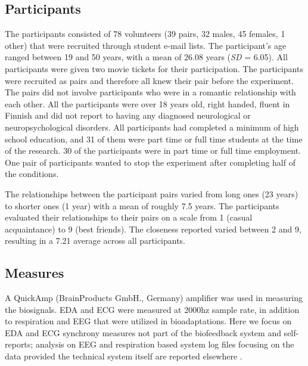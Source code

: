\documentclass[manuscript, review = false, screen]{acmart}
\begin{document}
\subsection{Participants}
The participants consisted of 78 volunteers (39 pairs,  32 males, 45 females, 1 other) that were recruited through student e-mail lists. The participant's age ranged between 19 and 50 years, with a mean of 26.08 years (\textit{SD} = 6.05). All participants were given two movie tickets for their participation. The participants were recruited as pairs and therefore all knew their pair before the experiment. The pairs did not involve participants who were in a romantic relationship with each other. All the participants were over 18 years old, right handed, fluent in Finnish and did not report to having any diagnosed neurological or neuropsychological disorders. All participants had completed a minimum of high school education, and 31 of them were part time or full time students at the time of the research. 30 of the participants were in part time or full time employment. One pair of participants wanted to stop the experiment after completing half of the conditions.

The relationships between the participant pairs varied from long ones (23 years) to shorter ones (1 year) with a mean of roughly 7.5 years. The participants evaluated their relationships to their pairs on a scale from 1 (casual acquaintance) to 9 (best friends). The closeness reported varied between 2 and 9, resulting in a 7.21 average across all participants. 

\subsection{Measures}
A QuickAmp (BrainProducts GmbH., Germany) amplifier was used in measuring the biosignals. EDA and ECG were measured at 2000hz sample rate, in addition to respiration and EEG that were utilized in bioadaptations. Here we focus on EDA and ECG synchrony measures not part of the biofeedback system and self-reports; analysis on EEG and respiration based system log files focusing on the data provided the technical system itself are reported elsewhere \cite{Salminen_Jarvela_Harjunen_Ruonala_Jacucci_Hamari_Ravaja}.
\end{document}

